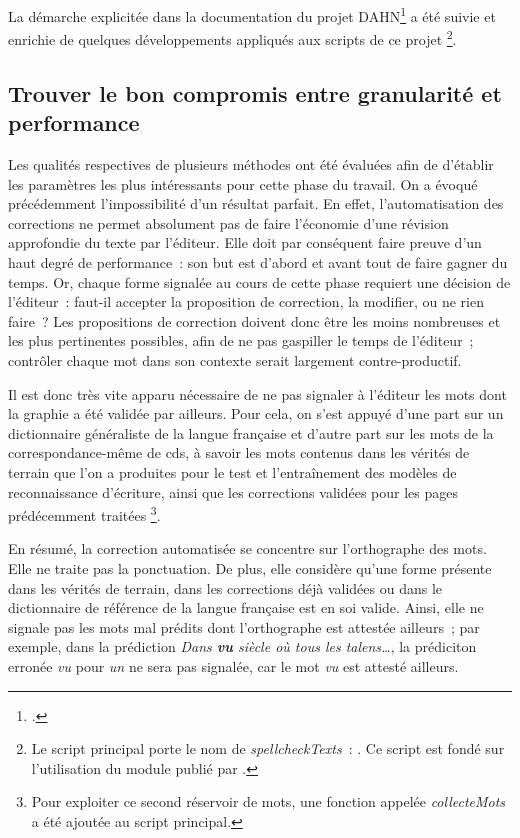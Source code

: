 \documentclass[a4paper,12pt,twoside]{book}
\begin{document}
			La démarche explicitée dans la documentation du projet DAHN\footcite{chiffoleauHowPostOCRCorrection2022} a été suivie et enrichie de quelques développements appliqués aux scripts de ce projet
			\footnote{Le script principal porte le nom de \textit{spellcheckTexts}~: \cite{biaySpellcheckTextsPy2022}. Ce script est fondé sur l'utilisation du module publié par \cite{barrusPyspellcheckerPurePython}.}.
					
			\subsection{Trouver le bon compromis entre granularité et performance}
				Les qualités respectives de plusieurs méthodes ont été évaluées afin de d'établir les paramètres les plus intéressants pour cette phase du travail. On a évoqué précédemment l'impossibilité d'un résultat parfait. En effet, l'automatisation des corrections ne permet absolument pas de faire l'économie d'une révision approfondie du texte par l'éditeur. Elle doit par conséquent faire preuve d'un haut degré de performance~: son but est d'abord et avant tout de faire gagner du temps. Or, chaque forme signalée au cours de cette phase requiert une décision de l'éditeur~: faut-il accepter la proposition de correction, la modifier, ou ne rien faire~? Les propositions de correction doivent donc être les moins nombreuses et les plus pertinentes possibles, afin de ne pas gaspiller le temps de l'éditeur~; contrôler chaque mot dans son contexte serait largement contre-productif.
				
				Il est donc très vite apparu nécessaire de ne pas signaler à l'éditeur les mots dont la graphie a été validée par ailleurs. Pour cela, on s'est appuyé d'une part sur un dictionnaire généraliste de la langue française et d'autre part sur les mots de la correspondance-même de \gls{cds}, à savoir les mots contenus dans les vérités de terrain que l'on a produites pour le test et l'entraînement des modèles de reconnaissance d'écriture, ainsi que les corrections validées pour les pages prédécemment traitées 
				\footnote{Pour exploiter ce second réservoir de mots, une fonction appelée \textit{collecteMots} a été ajoutée au script principal.}.
			
				En résumé, la correction automatisée se concentre sur l'orthographe des mots. Elle ne traite pas la ponctuation. De plus, elle considère qu'une forme présente dans les vérités de terrain, dans les corrections déjà validées ou dans le dictionnaire de référence de la langue française est en soi valide. Ainsi, elle ne signale pas les mots mal prédits dont l'orthographe est attestée ailleurs~; par exemple, dans la \gls{prédiction} \textit{Dans \textbf{vu} siècle où tous les talens…}, la prédiciton erronée \textit{vu} pour \textit{un} ne sera pas signalée, car le mot \textit{vu} est attesté ailleurs.
					
\end{document}
